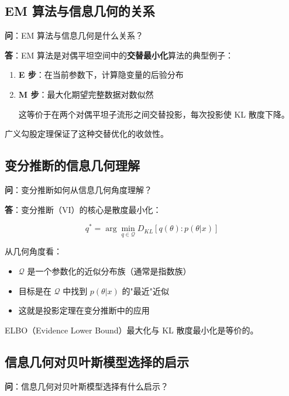 \subsection{EM 算法与信息几何的关系}\label{sec:qa-em-algorithm-info-geometry}

\textbf{问}：EM 算法与信息几何是什么关系？

\textbf{答}：EM 算法是对偶平坦空间中的\textbf{交替最小化}算法的典型例子：

\begin{enumerate}
    \item \textbf{E 步}：在当前参数下，计算隐变量的后验分布
    \item \textbf{M 步}：最大化期望完整数据对数似然

    这等价于在两个对偶平坦子流形之间交替投影，每次投影使 KL 散度下降。
\end{enumerate}

广义勾股定理保证了这种交替优化的收敛性。

\subsection{变分推断的信息几何理解}\label{sec:qa-variational-inference-geometry}

\textbf{问}：变分推断如何从信息几何角度理解？

\textbf{答}：变分推断（VI）的核心是散度最小化：

\begin{equation}
q^* = \arg\min_{q \in \mathcal{Q}} D_{KL}[q(\theta) : p(\theta|x)]
\end{equation}

从几何角度看：
\begin{itemize}
    \item $\mathcal{Q}$ 是一个参数化的近似分布族（通常是指数族）
    \item 目标是在 $\mathcal{Q}$ 中找到 $p(\theta|x)$ 的"最近"近似
    \item 这就是投影定理在变分推断中的应用
\end{itemize}

ELBO（Evidence Lower Bound）最大化与 KL 散度最小化是等价的。

\subsection{信息几何对贝叶斯模型选择的启示}\label{sec:qa-info-geometry-bayesian-model}

\textbf{问}：信息几何对贝叶斯模型选择有什么启示？


